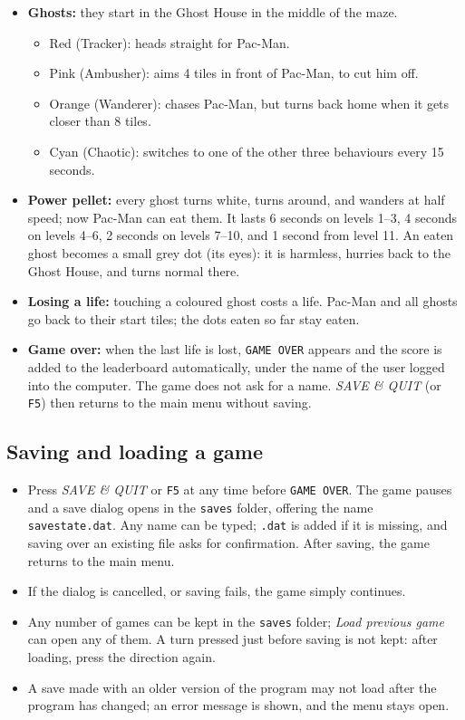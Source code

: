 \documentclass[11pt, a4paper]{article}
\begin{document}
\begin{itemize}
    \item \textbf{Ghosts:} they start in the Ghost House in the middle of the maze.
    \begin{itemize}
        \item Red (Tracker): heads straight for Pac-Man.
        \item Pink (Ambusher): aims 4 tiles in front of Pac-Man, to cut him off.
        \item Orange (Wanderer): chases Pac-Man, but turns back home when it gets closer than 8 tiles.
        \item Cyan (Chaotic): switches to one of the other three behaviours every 15 seconds.
    \end{itemize}
    \item \textbf{Power pellet:} every ghost turns white, turns around, and wanders at half speed; now Pac-Man can eat them. It lasts 6 seconds on levels 1--3, 4 seconds on levels 4--6, 2 seconds on levels 7--10, and 1 second from level 11. An eaten ghost becomes a small grey dot (its eyes): it is harmless, hurries back to the Ghost House, and turns normal there.
    \item \textbf{Losing a life:} touching a coloured ghost costs a life. Pac-Man and all ghosts go back to their start tiles; the dots eaten so far stay eaten.
    \item \textbf{Game over:} when the last life is lost, \texttt{GAME OVER} appears and the score is added to the leaderboard automatically, under the name of the user logged into the computer. The game does not ask for a name. \textit{SAVE \& QUIT} (or \texttt{F5}) then returns to the main menu without saving.
\end{itemize}

\subsection*{Saving and loading a game}
\begin{itemize}
    \item Press \textit{SAVE \& QUIT} or \texttt{F5} at any time before \texttt{GAME OVER}. The game pauses and a save dialog opens in the \texttt{saves} folder, offering the name \texttt{savestate.dat}. Any name can be typed; \texttt{.dat} is added if it is missing, and saving over an existing file asks for confirmation. After saving, the game returns to the main menu.
    \item If the dialog is cancelled, or saving fails, the game simply continues.
    \item Any number of games can be kept in the \texttt{saves} folder; \textit{Load previous game} can open any of them. A turn pressed just before saving is not kept: after loading, press the direction again.
    \item A save made with an older version of the program may not load after the program has changed; an error message is shown, and the menu stays open.
\end{itemize}
\end{document}
